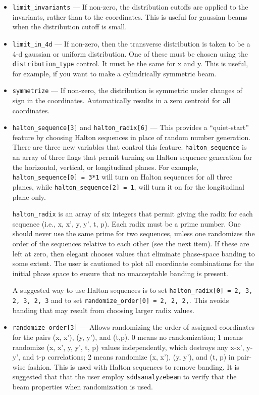 \documentclass[11pt]{article}
\begin{document}
\begin{itemize}
\item \verb|limit_invariants| --- If non-zero, the distribution
cutoffs are applied to the invariants, rather than to the coordinates.
This is useful for gaussian beams when the distribution cutoff is
small.

\item \verb|limit_in_4d| --- If non-zero, then the transverse
distribution is taken to be a 4-d gaussian or uniform distribution.
One of these must be chosen using the \verb|distribution_type|
control.  It must be the same for x and y.  This is useful, for
example, if you want to make a cylindrically symmetric beam.

\item \verb|symmetrize| --- If non-zero, the distribution is symmetric
under changes of sign in the coordinates.  Automatically results in a
zero centroid for all coordinates.

\item \verb|halton_sequence[3]| and \verb|halton_radix[6]| --- This
provides a ``quiet-start'' feature by choosing Halton sequences in
place of random number generation.  There are three new variables that
control this feature.  \verb|halton_sequence| is an array of three
flags that permit turning on Halton sequence generation for the
horizontal, vertical, or longitudinal planes.  For example,
\verb|halton_sequence[0] = 3*1| will turn on Halton sequences for all
three planes, while \verb|halton_sequence[2] = 1|, will turn it on for
the longitudinal plane only.

\verb|halton_radix| is an array of six integers that permit giving the
radix for each sequence (i.e., x, x', y, y', t, p).  Each radix must
be a prime number.  One should never use the same prime for two
sequences, unless one randomizes the order of the sequences relative to
each other (see the next item).  If these are left at zero, then
elegant chooses values that eliminate phase-space banding to some
extent.  The user is cautioned to plot all coordinate combinations for
the initial phase space to ensure that no unacceptable banding is
present.

A suggested way to use Halton sequences is to set
\verb|halton_radix[0] = 2, 3, 2, 3, 2, 3| and
to set 
\verb|randomize_order[0] = 2, 2, 2,|.  This avoids banding that may
result from choosing larger radix values.

\item \verb|randomize_order[3]| --- Allows randomizing the order of
assigned coordinates for the pairs (x, x'), (y, y'), and (t,p).  0
means no randomization; 1 means randomize (x, x', y, y', t, p) values
independently, which destroys any x-x', y-y', and t-p correlations; 2
means randomize (x, x'), (y, y'), and (t, p) in pair-wise fashion.
This is used with Halton sequences to remove banding.  It is suggested
that that the user employ \verb|sddsanalyzebeam| to verify that the
beam properties when randomization is used.


\end{itemize}
\end{document}
